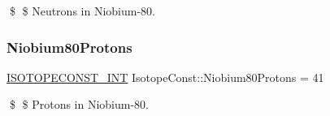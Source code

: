 \$ \$ Neutrons in Niobium-\/80. \mbox{\label{group___isotope_const-_niobium-_nb80_ga8bef95ab3a5ab5c38d074b78041ca425}} 
\subsubsection{\texorpdfstring{Niobium80\+Protons}{Niobium80Protons}}
{\footnotesize\ttfamily \mbox{\hyperlink{group___isotope_const-_macros_ga5f18360b3e99483a35c32d789e62621c}{I\+S\+O\+T\+O\+P\+E\+C\+O\+N\+S\+T\+\_\+\+I\+NT}} Isotope\+Const\+::\+Niobium80\+Protons = 41}

\$ \$ Protons in Niobium-\/80. 